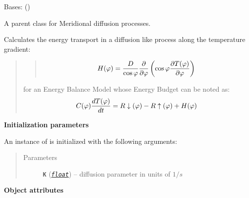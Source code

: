 \documentclass[a4paper,10pt,english]{sphinxmanual}
\begin{document}
\begin{fulllineitems}
\label{api/climlab.dynamics:climlab.dynamics.diffusion.MeridionalDiffusion}
Bases: {\hyperref[api/climlab.dynamics:climlab.dynamics.diffusion.Diffusion]{\emph{}}} ()

A parent class for Meridional diffusion processes.

Calculates the energy transport in a diffusion like process along the
temperature gradient:
\begin{quote}
\begin{quote}
\begin{gather}
\begin{split}H(\varphi) = \frac{D}{\cos \varphi}\frac{\partial}{\partial \varphi} \left( \cos\varphi \frac{\partial T(\varphi)}{\partial \varphi} \right)\end{split}\notag
\end{gather}\end{quote}

for an Energy Balance Model whose Energy Budget can be noted as:
\begin{gather}
\begin{split}C(\varphi) \frac{dT(\varphi)}{dt} = R\downarrow (\varphi) - R\uparrow (\varphi) + H(\varphi)\end{split}\notag
\end{gather}\end{quote}

\textbf{Initialization parameters}

An instance of  is initialized with the following 
arguments:
\begin{quote}\begin{description}
\item[{Parameters}] \leavevmode
\textbf{\texttt{K}} (\href{http://docs.python.org/2.7/library/functions.html\#float}{\emph{\texttt{float}}}) -- diffusion parameter in units of \(1/s\)

\end{description}\end{quote}

\textbf{Object attributes}


\end{fulllineitems}
\end{document}
